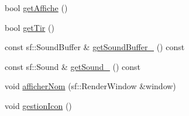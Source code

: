 \begin{DoxyCompactItemize}
$$\item 
bool \hyperlink{class_capacite_a6dd5ea561e52140a345be7e62a33cf1f}{get\+Affiche} ()
\item 
bool \hyperlink{class_capacite_a40152147df357f3c0d9ea1116b0f7241}{get\+Tir} ()
\item 
const sf\+::\+Sound\+Buffer \& \hyperlink{class_capacite_a35743163d8764fe437b3ca96bbd1dad1}{get\+Sound\+Buffer\+\_\+} () const
\item 
const sf\+::\+Sound \& \hyperlink{class_capacite_a9850d3e1c8166d4a7e932d288b8fce60}{get\+Sound\+\_\+} () const
\item 
void \hyperlink{class_capacite_a103031e01d2fc714b52105b23f3547d1}{afficher\+Nom} (sf\+::\+Render\+Window \&window)
\item 
void \hyperlink{class_capacite_af50b4c0bf1de8d846c998cba83e1e51f}{gestion\+Icon} ()
\end{DoxyCompactItemize}
